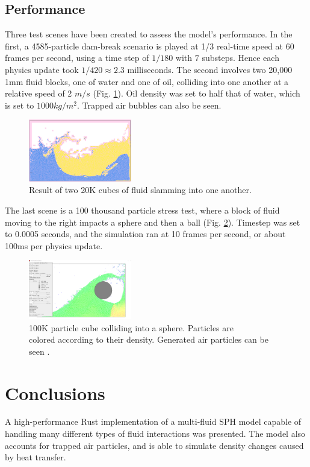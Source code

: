 \documentclass[acmtog,review]{acmart}
\begin{document}
\subsection{Performance}
Three test scenes have been created to assess the model's performance. In the first, a 4585-particle dam-break scenario is played at 1/3 real-time speed at 60 frames per second, using a time step of $1/180$ with $7$ substeps. Hence each physics update took $1/420 \approx 2.3$ milliseconds. The second involves two 20,000 1mm fluid blocks, one of water and one of oil, colliding into one another at a relative speed of 2 $m/s$ (Fig. \ref{stress1}). Oil density was set to half that of water, which is set to $1000kg/m^2$.  Trapped air bubbles can also be seen.
\begin{figure}[h]
    \includegraphics[width=0.4\textwidth]{stress_test_1.PNG}
    \caption{Result of two 20K cubes of fluid slamming into one another.}
    \label{stress1}
\end{figure}
The last scene is a 100 thousand particle stress test, where a block of fluid moving to the right impacts a sphere and then a ball (Fig. \ref{stress2}). Timestep was set to 0.0005 seconds, and the simulation ran at 10 frames per second, or about 100ms per physics update. 
\begin{figure}[h]
  \includegraphics[width=0.4\textwidth]{stress_test_2.PNG}
  \caption{100K particle cube colliding into a sphere. Particles are \\ 
  colored according to their density. Generated air particles can be seen . }
  \label{stress2}
\end{figure}

\section{Conclusions}
A high-performance Rust implementation of a multi-fluid SPH model capable of handling many different types of fluid interactions was presented. The model also accounts for trapped air particles, and is able to simulate density changes caused by heat transfer.



\end{document}
